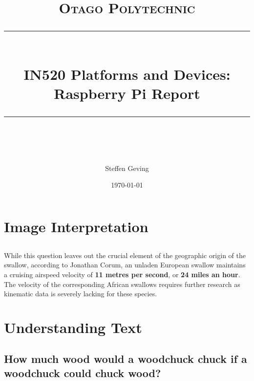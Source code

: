 \documentclass[11pt]{scrartcl} %
\title{	
	\normalfont\normalsize
	\textsc{Otago Polytechnic}\\ %
	\vspace{25pt} %
	\rule{\linewidth}{0.5pt}\\ %
	\vspace{20pt} %
	{\huge IN520 Platforms and Devices: Raspberry Pi Report}\\ %
	\vspace{12pt} %
	\rule{\linewidth}{2pt}\\ %
	\vspace{12pt} %
}
\author{\LARGE Steffen Geving} %
\date{\normalsize\today} %
\begin{document}
\maketitle %


\section{Image Interpretation}



\subsection{}

While this question leaves out the crucial element of the geographic origin of the swallow, according to Jonathan Corum, an unladen European swallow maintains a cruising airspeed velocity of \textbf{11 metres per second}, or \textbf{24 miles an hour}. The velocity of the corresponding African swallows requires further research as kinematic data is severely lacking for these species.


\section{Understanding Text}

\subsection{How much wood would a woodchuck chuck if a woodchuck could chuck wood?}

\end{document}
